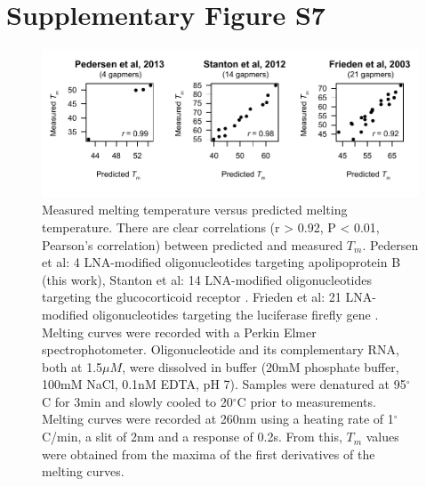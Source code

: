 \documentclass[a4paper,11pt]{article}
\newenvironment{Ncenter}{%
  \setlength\topsep{-10pt}
  \setlength\parskip{-100pt}
  \begin{center}
}{%
  \end{center}
}
\begin{document}
\section{Supplementary Figure S7}
\begin{figure}[!h]
\begin{Ncenter}
\includegraphics[width=\textwidth]{SuppFigS3.pdf}
\end{Ncenter}
\caption{Measured melting temperature versus predicted melting temperature. There are clear correlations (r > 0.92, P < 0.01, Pearson's correlation) between predicted and measured $T_m$. Pedersen et al: 4 LNA-modified oligonucleotides targeting apolipoprotein B (this work), Stanton et al: 14 LNA-modified oligonucleotides targeting the glucocorticoid receptor \cite{Stanton:2012fu}. Frieden et al: 21 LNA-modified oligonucleotides targeting the luciferase firefly gene \cite{Frieden:2003er}.\\
Melting curves were recorded with a Perkin Elmer spectrophotometer. Oligonucleotide and its complementary RNA, both at 1.5$\mu M$, were dissolved in buffer (20mM phosphate buffer, 100mM NaCl, 0.1nM EDTA, pH 7). Samples were denatured at 95$^\circ$C for 3min and slowly cooled to 20$^\circ$C prior to measurements. Melting curves were recorded at 260nm using a heating rate of 1$^\circ$C/min, a slit of 2nm and a response of 0.2s. From this, $T_m$ values were obtained from the maxima of the first derivatives of the melting curves.}\label{fig:figTm}
\end{figure}

\newpage

\end{document}
